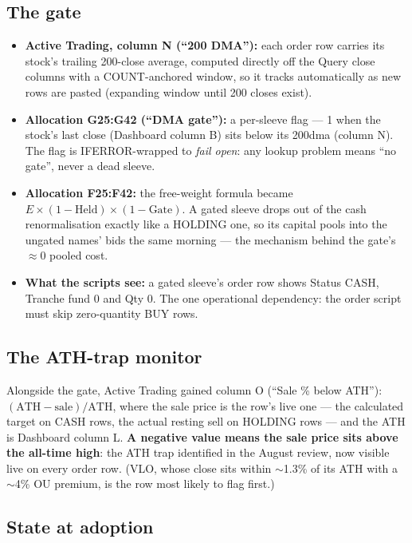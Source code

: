 \documentclass[11pt,a4paper]{article}
\begin{document}
\subsection{The gate}

\begin{itemize}
\item \textbf{Active Trading, column N (``200 DMA''):} each order row carries its
stock's trailing 200-close average, computed directly off the Query close columns
with a COUNT-anchored window, so it tracks automatically as new rows are pasted
(expanding window until 200 closes exist).
\item \textbf{Allocation G25:G42 (``DMA gate''):} a per-sleeve flag --- 1 when the
stock's last close (Dashboard column B) sits below its 200dma (column N). The
flag is IFERROR-wrapped to \emph{fail open}: any lookup problem means ``no
gate'', never a dead sleeve.
\item \textbf{Allocation F25:F42:} the free-weight formula became
$E \times (1-\text{Held}) \times (1-\text{Gate})$. A gated sleeve drops out of
the cash renormalisation exactly like a HOLDING one, so its capital pools into
the ungated names' bids the same morning --- the mechanism behind the gate's
$\approx$0 pooled cost.
\item \textbf{What the scripts see:} a gated sleeve's order row shows Status
CASH, Tranche fund 0 and Qty 0. The one operational dependency: the order
script must skip zero-quantity BUY rows.
\end{itemize}

\subsection{The ATH-trap monitor}

Alongside the gate, Active Trading gained column O (``Sale \% below ATH''):
$(\text{ATH} - \text{sale})/\text{ATH}$, where the sale price is the row's live
one --- the calculated target on CASH rows, the actual resting sell on HOLDING
rows --- and the ATH is Dashboard column L. \textbf{A negative value means the
sale price sits above the all-time high}: the ATH trap identified in the August
review, now visible live on every order row. (VLO, whose close sits within
$\sim$1.3\% of its ATH with a $\sim$4\% OU premium, is the row most likely to
flag first.)

\subsection{State at adoption}
\end{document}
